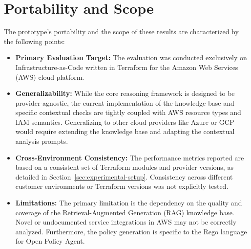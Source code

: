 


\section{Portability and Scope}\label{sec:results-portability}

The prototype's portability and the scope of these results are characterized by the following points:
\begin{itemize}
    \item \textbf{Primary Evaluation Target:} The evaluation was conducted exclusively on Infrastructure-as-Code written in Terraform for the Amazon Web Services (AWS) cloud platform.
    \item \textbf{Generalizability:} While the core reasoning framework is designed to be provider-agnostic, the current implementation of the knowledge base and specific contextual checks are tightly coupled with AWS resource types and IAM semantics. Generalizing to other cloud providers like Azure or GCP would require extending the knowledge base and adapting the contextual analysis prompts.
    \item \textbf{Cross-Environment Consistency:} The performance metrics reported are based on a consistent set of Terraform modules and provider versions, as detailed in Section~\ref{sec:experimental-setup}. Consistency across different customer environments or Terraform versions was not explicitly tested.
    \item \textbf{Limitations:} The primary limitation is the dependency on the quality and coverage of the Retrieval-Augmented Generation (RAG) knowledge base. Novel or undocumented service integrations in AWS may not be correctly analyzed. Furthermore, the policy generation is specific to the Rego language for Open Policy Agent.
\end{itemize}

